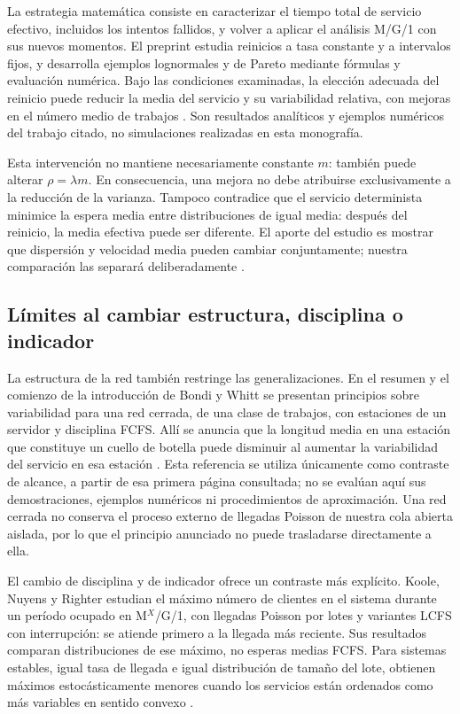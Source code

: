 La estrategia matemática consiste en caracterizar el tiempo total de servicio efectivo, incluidos los intentos fallidos, y volver a aplicar el análisis M/G/1 con sus nuevos momentos. El preprint estudia reinicios a tasa constante y a intervalos fijos, y desarrolla ejemplos lognormales y de Pareto mediante fórmulas y evaluación numérica. Bajo las condiciones examinadas, la elección adecuada del reinicio puede reducir la media del servicio y su variabilidad relativa, con mejoras en el número medio de trabajos \cite{lauberbonomo2021resetting}. Son resultados analíticos y ejemplos numéricos del trabajo citado, no simulaciones realizadas en esta monografía.

Esta intervención no mantiene necesariamente constante $m$: también puede alterar $\rho=\lambda m$. En consecuencia, una mejora no debe atribuirse exclusivamente a la reducción de la varianza. Tampoco contradice que el servicio determinista minimice la espera media entre distribuciones de igual media: después del reinicio, la media efectiva puede ser diferente. El aporte del estudio es mostrar que dispersión y velocidad media pueden cambiar conjuntamente; nuestra comparación las separará deliberadamente \cite{lauberbonomo2021resetting}.

\subsection{Límites al cambiar estructura, disciplina o indicador}
\label{subsec:literatura-limites}

La estructura de la red también restringe las generalizaciones. En el resumen y el comienzo de la introducción de Bondi y Whitt se presentan principios sobre variabilidad para una red cerrada, de una clase de trabajos, con estaciones de un servidor y disciplina FCFS. Allí se anuncia que la longitud media en una estación que constituye un cuello de botella puede disminuir al aumentar la variabilidad del servicio en esa estación \cite{bondiwhitt1986variabilidad}. Esta referencia se utiliza únicamente como contraste de alcance, a partir de esa primera página consultada; no se evalúan aquí sus demostraciones, ejemplos numéricos ni procedimientos de aproximación. Una red cerrada no conserva el proceso externo de llegadas Poisson de nuestra cola abierta aislada, por lo que el principio anunciado no puede trasladarse directamente a ella.

El cambio de disciplina y de indicador ofrece un contraste más explícito. Koole, Nuyens y Righter estudian el máximo número de clientes en el sistema durante un período ocupado en M$^X$/G/1, con llegadas Poisson por lotes y variantes LCFS con interrupción: se atiende primero a la llegada más reciente. Sus resultados comparan distribuciones de ese máximo, no esperas medias FCFS. Para sistemas estables, igual tasa de llegada e igual distribución de tamaño del lote, obtienen máximos estocásticamente menores cuando los servicios están ordenados como más variables en sentido convexo \cite{koole2005maximos}.

